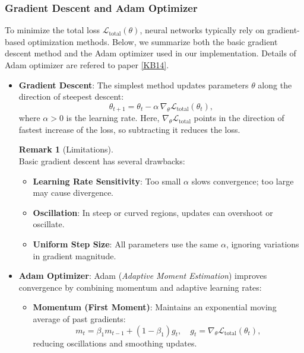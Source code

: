 \documentclass[12pt,a4paper]{article}
\theoremstyle{definition}
\newtheorem{remark}{Remark}[subsection]
\begin{document}
\subsubsection{Gradient Descent and Adam Optimizer} \label{sec:adam_optimizer}

To minimize the total loss $\mathcal{L}_{\text{total}}(\theta)$, neural networks typically rely on gradient-based optimization methods. Below, we summarize both the basic gradient descent method and the Adam optimizer used in our implementation. Details of Adam optimizer are refered to paper \hyperlink{[KB14]}{[KB14]}.

\begin{itemize}[noitemsep, topsep=0pt]

    \item \textbf{Gradient Descent}: 
    The simplest method updates parameters $\theta$ along the direction of steepest descent:
    \[
    \theta_{t+1} = \theta_t - \alpha \, \nabla_\theta \mathcal{L}_{\text{total}}(\theta_t),
    \]
    where $\alpha > 0$ is the learning rate. Here, $\nabla_\theta \mathcal{L}_{\text{total}}$ points in the direction of fastest increase of the loss, so subtracting it reduces the loss.

    \begin{remark}[Limitations] ~\\
    Basic gradient descent has several drawbacks:
    \begin{itemize}[noitemsep]
        \item \textbf{Learning Rate Sensitivity}: Too small $\alpha$ slows convergence; too large may cause divergence.
        \item \textbf{Oscillation}: In steep or curved regions, updates can overshoot or oscillate.
        \item \textbf{Uniform Step Size}: All parameters use the same $\alpha$, ignoring variations in gradient magnitude.
    \end{itemize}
    \end{remark}

    \item \textbf{Adam Optimizer}: 
    Adam (\textit{Adaptive Moment Estimation}) improves convergence by combining momentum and adaptive learning rates:

    \begin{itemize}[noitemsep]
        \item \textbf{Momentum (First Moment)}: Maintains an exponential moving average of past gradients:
        \[
        m_t = \beta_1 m_{t-1} + (1-\beta_1) g_t, \quad g_t = \nabla_\theta \mathcal{L}_{\text{total}}(\theta_t),
        \]
        reducing oscillations and smoothing updates.


\end{itemize}
\end{itemize}
\end{document}
